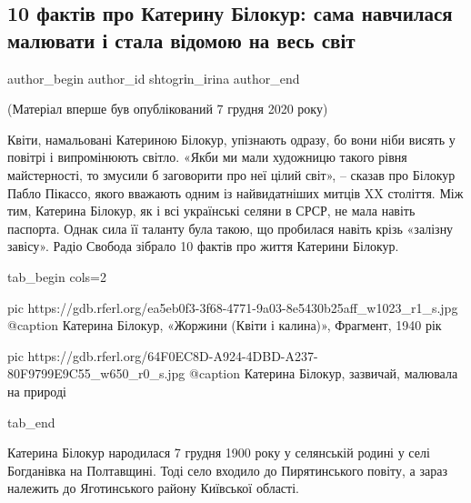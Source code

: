  
 
 
 
 
\subsection{10 фактів про Катерину Білокур: сама навчилася малювати і стала відомою на весь світ}
\label{sec:07_12_2021.stz.news.ua.radiosvoboda.1.bilokur_katerina}


\ifcmt
 author_begin
   author_id shtogrіn_іrina
 author_end
\fi

\noindent

(Матеріал вперше був опублікований 7 грудня 2020 року)

Квіти, намальовані Катериною Білокур, упізнають одразу, бо вони ніби висять у
повітрі і випромінюють світло. «Якби ми мали художницю такого рівня
майстерності, то змусили б заговорити про неї цілий світ», – сказав про Білокур
Пабло Пікассо, якого вважають одним із найвидатніших митців XX століття. Між
тим, Катерина Білокур, як і всі українські селяни в СРСР, не мала навіть
паспорта. Однак сила її таланту була такою, що пробилася навіть крізь «залізну
завісу». Радіо Свобода зібрало 10 фактів про життя Катерини Білокур.

\ifcmt
  tab_begin cols=2

     pic https://gdb.rferl.org/ea5eb0f3-3f68-4771-9a03-8e5430b25aff_w1023_r1_s.jpg
		 @caption Катерина Білокур, «Жоржини (Квіти і калина)», Фрагмент, 1940 рік

     pic https://gdb.rferl.org/64F0EC8D-A924-4DBD-A237-80F9799E9C55_w650_r0_s.jpg
		 @caption Катерина Білокур, зазвичай, малювала на природі

  tab_end
\fi


Катерина Білокур народилася 7 грудня 1900 року у селянській родині у селі
Богданівка на Полтавщині. Тоді село входило до Пирятинського повіту, а зараз
належить до Яготинського району Київської області.


